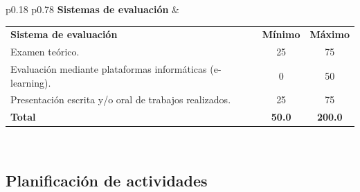 \documentclass[
  11pt,
  a4paper,
  twoside]{scrreprt}
\begin{document}
\begin{longtable}{p{} p{}}
\textbf{Sistemas de evaluación} &
\begin{tabular}[t]{@{}p{}c c@{}}
\textbf{Sistema de evaluación} & \textbf{Mínimo} & \textbf{Máximo} \\
Examen teórico. & 25 & 75 \\
Evaluación mediante plataformas informáticas (e-learning). & 0 & 50 \\
Presentación escrita y/o oral de trabajos realizados. & 25 & 75 \\
\textbf{Total} & \textbf{50.0} & \textbf{200.0} \\
\end{tabular} \\
\hline

\end{longtable}

\clearpage

\subsection{Planificación de
actividades}\label{planificaciuxf3n-de-actividades}
\end{document}
